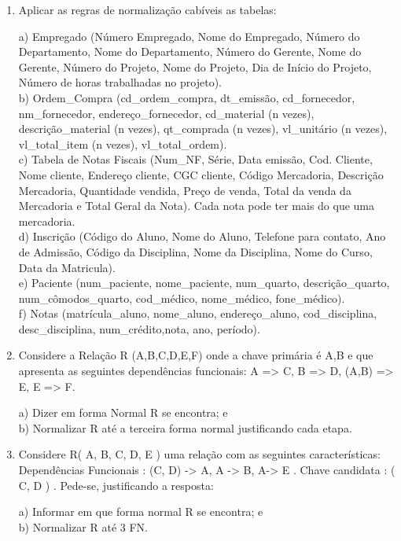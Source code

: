 \documentclass[11pt]{article}
\begin{document}
	\begin{enumerate}
		\item Aplicar as regras de normalização cabíveis as tabelas:
		
		a) Empregado (Número Empregado, Nome do Empregado, Número do Departamento, Nome
		do Departamento, Número do Gerente, Nome do Gerente, Número do Projeto, Nome do
		Projeto, Dia de Início do Projeto, Número de horas trabalhadas no projeto).\\
		b) Ordem\_Compra (cd\_ordem\_compra, dt\_emissão, cd\_fornecedor, nm\_fornecedor,
		endereço\_fornecedor, cd\_material (n vezes), descrição\_material (n vezes), qt\_comprada (n
		vezes), vl\_unitário (n vezes), vl\_total\_item (n vezes), vl\_total\_ordem).\\
		c) Tabela de Notas Fiscais (Num\_NF, Série, Data emissão, Cod. Cliente, Nome cliente,
		Endereço cliente, CGC cliente, Código Mercadoria, Descrição Mercadoria, Quantidade
		vendida, Preço de venda, Total da venda da Mercadoria e Total Geral da Nota). Cada nota pode
		ter mais do que uma mercadoria.\\
		d) Inscrição (Código do Aluno, Nome do Aluno, Telefone para contato, Ano de Admissão,
		Código da Disciplina, Nome da Disciplina, Nome do Curso, Data da Matricula).\\
		e) Paciente (num\_paciente, nome\_paciente, num\_quarto, descrição\_quarto,
		num\_cômodos\_quarto, cod\_médico, nome\_médico, fone\_médico).\\
		f) Notas (matrícula\_aluno, nome\_aluno, endereço\_aluno, cod\_disciplina, desc\_disciplina,
		num\_crédito,nota, ano, período).
		
		\item Considere a Relação R (A,B,C,D,E,F) onde a chave primária é A,B e que apresenta as seguintes
		dependências funcionais: A => C, B => D, (A,B) => E, E => F.
		
		a) Dizer em forma Normal R se encontra; e\\
		b) Normalizar R até a terceira forma normal justificando cada etapa. 
		
		\item Considere R( A, B, C, D, E ) uma relação com as seguintes características: Dependências
		Funcionais : (C, D) -> A, A -> B, A-> E . Chave candidata : ( C, D ) . Pede-se, justificando a
		resposta:
		
		a) Informar em que forma normal R se encontra; e\\
		b) Normalizar R até 3 FN.
		

\end{enumerate}
\end{document}

